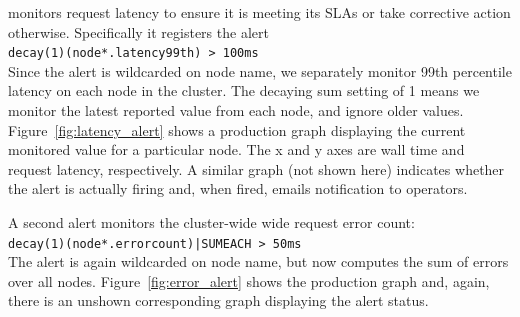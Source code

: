 \ES monitors request latency to ensure it is meeting its SLAs or take
corrective action otherwise.  Specifically it registers the alert \\
\texttt{decay(1)(node*.latency99th) > 100ms}  \\
Since the alert is wildcarded on node name, we separately monitor 99th
percentile latency on each node in the \ES cluster.  The decaying sum setting of 1
means we monitor the latest reported value from each node, and ignore older
values.  Figure~\ref{fig:latency_alert} shows a production graph displaying the current monitored value for a
particular \ES node.  The x and y axes are wall time and request latency,
respectively.  A similar graph (not shown here) indicates whether the
alert is actually firing and, when fired, emails notification to \ES operators.

A second alert monitors the cluster-wide wide request error count: \\
\texttt{decay(1)(node*.errorcount)|SUMEACH > 50ms}  \\
The alert is again wildcarded on node name, but now computes the sum of errors
over all nodes.  Figure~\ref{fig:error_alert} shows the production graph and,
again, there is an unshown corresponding graph displaying the alert status.

